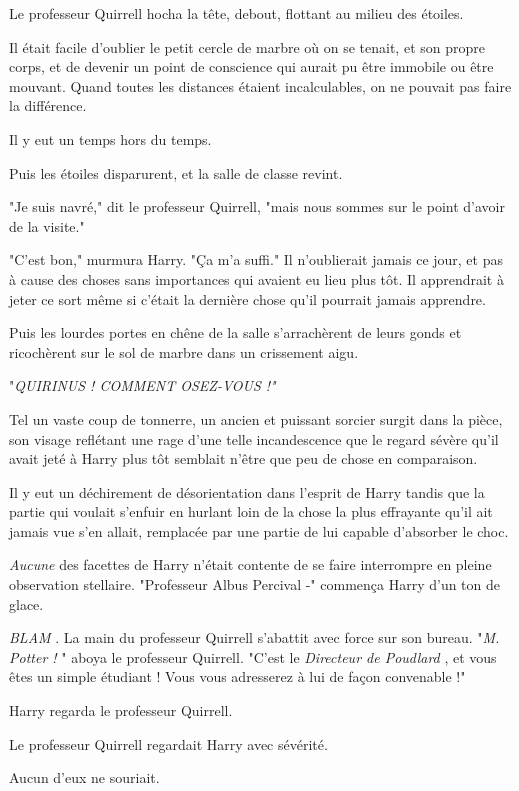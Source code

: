 Le professeur Quirrell hocha la tête, debout, flottant au milieu des étoiles.

Il était facile d'oublier le petit cercle de marbre où on se tenait, et son propre corps, et de devenir un point de conscience qui aurait pu être immobile ou être mouvant. Quand toutes les distances étaient incalculables, on ne pouvait pas faire la différence.

Il y eut un temps hors du temps.

Puis les étoiles disparurent, et la salle de classe revint.

"Je suis navré," dit le professeur Quirrell, "mais nous sommes sur le point d'avoir de la visite."

"C'est bon," murmura Harry. "Ça m'a suffi." Il n'oublierait jamais ce jour, et pas à cause des choses sans importances qui avaient eu lieu plus tôt. Il apprendrait à jeter ce sort même si c'était la dernière chose qu'il pourrait jamais apprendre.

Puis les lourdes portes en chêne de la salle s'arrachèrent de leurs gonds et ricochèrent sur le sol de marbre dans un crissement aigu.

"\emph{QUIRINUS ! COMMENT OSEZ-VOUS !"} 

Tel un vaste coup de tonnerre, un ancien et puissant sorcier surgit dans la pièce, son visage reflétant une rage d'une telle incandescence que le regard sévère qu'il avait jeté à Harry plus tôt semblait n'être que peu de chose en comparaison.

Il y eut un déchirement de désorientation dans l'esprit de Harry tandis que la partie qui voulait s'enfuir en hurlant loin de la chose la plus effrayante qu'il ait jamais vue s'en allait, remplacée par une partie de lui capable d'absorber le choc.

\emph{Aucune}  des facettes de Harry n'était contente de se faire interrompre en pleine observation stellaire. "Professeur Albus Percival -" commença Harry d'un ton de glace.

\emph{BLAM} . La main du professeur Quirrell s'abattit avec force sur son bureau. "\emph{M. Potter !} " aboya le professeur Quirrell. "C'est le \emph{Directeur de Poudlard} , et vous êtes un simple étudiant ! Vous vous adresserez à lui de façon convenable !"

Harry regarda le professeur Quirrell.

Le professeur Quirrell regardait Harry avec sévérité.

Aucun d'eux ne souriait.

